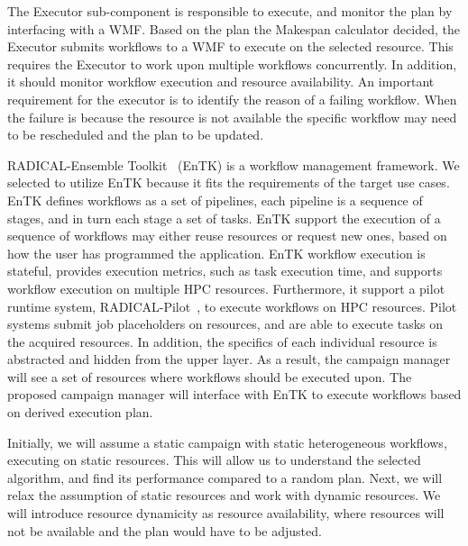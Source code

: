 The Executor sub-component is responsible to execute, and monitor the plan by interfacing with a WMF.
Based on the plan the Makespan calculator decided, the Executor submits workflows to a WMF to execute on the selected resource.
This requires the Executor to work upon multiple workflows concurrently.
In addition, it should monitor workflow execution and resource availability.
An important requirement for the executor is to identify the reason of a failing workflow.
When the failure is because the resource is not available the specific workflow may need to be rescheduled and the plan to be updated.

RADICAL-Ensemble Toolkit~\cite{balasubramanian2018harnessing} (EnTK) is a workflow management framework.
We selected to utilize EnTK because it fits the requirements of the target use cases.
EnTK defines workflows as a set of pipelines, each pipeline is a sequence of stages, and in turn each stage a set of tasks.
EnTK support the execution of a sequence of workflows may either reuse resources or request new ones, based on how the user has programmed the application.
EnTK workflow execution is stateful, provides execution metrics, such as task execution time, and supports workflow execution on multiple HPC resources.
Furthermore, it support a pilot runtime system, RADICAL-Pilot~\cite{merzky2019using}, to execute workflows on HPC resources.
Pilot systems submit job placeholders on resources, and are able to execute tasks on the acquired resources.
In addition, the specifics of each individual resource is abstracted and hidden from the upper layer.
As a result, the campaign manager will see a set of resources where workflows should be executed upon.
The proposed campaign manager will interface with EnTK to execute workflows based on derived execution plan.


Initially, we will assume a static campaign with static heterogeneous workflows, executing on static resources.
This will allow us to understand the selected algorithm, and find its performance compared to a random plan.
Next, we will relax the assumption of static resources and work with dynamic resources.
We will introduce resource dynamicity as resource availability, where resources will not be available and the plan would have to be adjusted.
